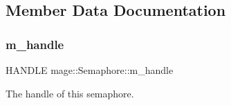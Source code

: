 \subsection{Member Data Documentation}
\hypertarget{classmage_1_1_semaphore_ac1ded856984b4ac3739d9ff627838fda}{}\label{classmage_1_1_semaphore_ac1ded856984b4ac3739d9ff627838fda} 
\subsubsection{\texorpdfstring{m\+\_\+handle}{m\_handle}}
{\footnotesize\ttfamily H\+A\+N\+D\+LE mage\+::\+Semaphore\+::m\+\_\+handle\hspace{0.3cm}{\ttfamily [private]}}

The handle of this semaphore. 